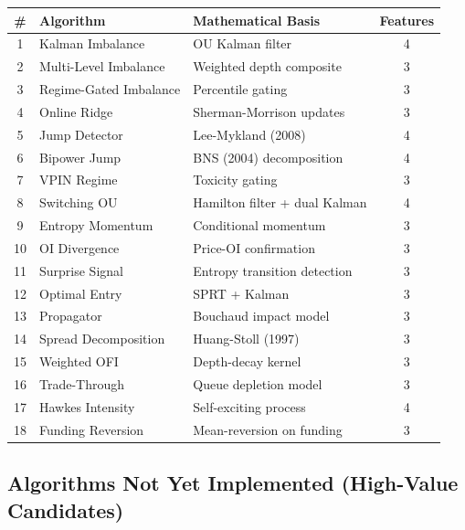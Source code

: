 \documentclass[11pt,a4paper]{article}
\begin{document}
\begin{center}
\begin{longtable}{c l l c}
\hline
\textbf{\#} & \textbf{Algorithm} & \textbf{Mathematical Basis} & \textbf{Features} \\
\hline
\endhead
1 & Kalman Imbalance & OU Kalman filter & 4 \\
2 & Multi-Level Imbalance & Weighted depth composite & 3 \\
3 & Regime-Gated Imbalance & Percentile gating & 3 \\
4 & Online Ridge & Sherman-Morrison updates & 3 \\
5 & Jump Detector & Lee-Mykland (2008) & 4 \\
6 & Bipower Jump & BNS (2004) decomposition & 4 \\
7 & VPIN Regime & Toxicity gating & 3 \\
8 & Switching OU & Hamilton filter + dual Kalman & 4 \\
9 & Entropy Momentum & Conditional momentum & 3 \\
10 & OI Divergence & Price-OI confirmation & 3 \\
11 & Surprise Signal & Entropy transition detection & 3 \\
12 & Optimal Entry & SPRT + Kalman & 3 \\
13 & Propagator & Bouchaud impact model & 3 \\
14 & Spread Decomposition & Huang-Stoll (1997) & 3 \\
15 & Weighted OFI & Depth-decay kernel & 3 \\
16 & Trade-Through & Queue depletion model & 3 \\
17 & Hawkes Intensity & Self-exciting process & 4 \\
18 & Funding Reversion & Mean-reversion on funding & 3 \\
\hline
\end{longtable}
\end{center}

\subsection{Algorithms Not Yet Implemented (High-Value Candidates)}
\end{document}
